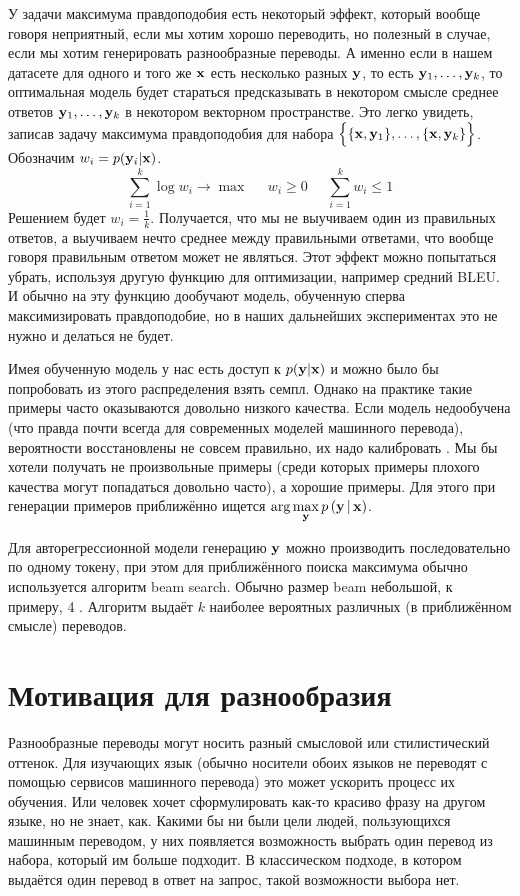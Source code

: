 \documentclass[a4paper, 12pt]{extarticle}
\begin{document}
    У задачи максимума правдоподобия есть некоторый эффект, который вообще говоря неприятный, если мы хотим хорошо переводить, но полезный в случае, если мы хотим генерировать разнообразные переводы. А именно если в нашем датасете для одного и того же $\bold{x}$ есть несколько разных $\bold{y}$, то есть $\bold{y}_1, \dots, \bold{y}_k$, то оптимальная модель будет стараться предсказывать в некотором смысле среднее ответов $\bold{y}_1, \dots, \bold{y}_k$ в некотором векторном пространстве. Это легко увидеть, записав задачу максимума правдоподобия для набора $\Big\{ \{ \bold{x}, \bold{y}_1 \}, \dots, \{ \bold{x}, \bold{y}_k \} \Big\}$. Обозначим $w_i = p(\bold{y}_i | \bold{x})$.
    $$\sum_{i=1}^k \log w_i \rightarrow\max \;\;\;\;\; w_i \geq 0 \;\;\;\;\; \sum_{i=1}^k w_i \leq 1$$
    Решением будет $w_i = \frac{1}{k}$. Получается, что мы не выучиваем один из правильных ответов, а выучиваем нечто среднее между правильными ответами, что вообще говоря правильным ответом может не являться. Этот эффект можно попытаться убрать, используя другую функцию для оптимизации, например средний BLEU. И обычно на эту функцию дообучают \cite{GNMT} модель, обученную сперва максимизировать правдоподобие, но в наших дальнейших экспериментах это не нужно и делаться не будет.

    Имея обученную модель у нас есть доступ к $p(\bold{y} | \bold{x})$ и можно было бы попробовать из этого распределения взять семпл. Однако на практике такие примеры часто оказываются довольно низкого качества. Если модель недообучена (что правда почти всегда для современных моделей машинного перевода), вероятности восстановлены не совсем правильно, их надо калибровать \cite{calibration}. Мы бы хотели получать не произвольные примеры (среди которых примеры плохого качества могут попадаться довольно часто), а хорошие примеры. Для этого при генерации примеров приближённо ищется $\arg\max\limits_{\bold{y}} p \, (\bold{y} \, | \, \bold{x})$.

    Для авторегрессионной модели генерацию $\bold{y}$ можно производить последовательно по одному токену, при этом для приближённого поиска максимума обычно используется алгоритм beam search. Обычно размер beam небольшой, к примеру, 4 \cite{analyzing-uncertainty}. Алгоритм выдаёт $k$ наиболее вероятных различных (в приближённом смысле) переводов.

\section{Мотивация для разнообразия}
    Разнообразные переводы могут носить разный смысловой или стилистический оттенок. Для изучающих язык (обычно носители обоих языков не переводят с помощью сервисов машинного перевода) это может ускорить процесс их обучения. Или человек хочет сформулировать как-то красиво фразу на другом языке, но не знает, как. Какими бы ни были цели людей, пользующихся машинным переводом, у них появляется возможность выбрать один перевод из набора, который им больше подходит. В классическом подходе, в котором выдаётся один перевод в ответ на запрос, такой возможности выбора нет.
\end{document}
